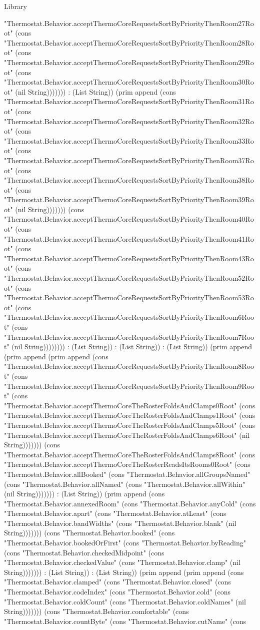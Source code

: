 \begin{lexlean}{Library}
\begin{semanticmodule}
{"Thermostat.Behavior.acceptThermoCoreRequestsSortByPriorityThenRoom27Root" (cons "Thermostat.Behavior.acceptThermoCoreRequestsSortByPriorityThenRoom28Root" (cons "Thermostat.Behavior.acceptThermoCoreRequestsSortByPriorityThenRoom29Root" (cons "Thermostat.Behavior.acceptThermoCoreRequestsSortByPriorityThenRoom30Root" (nil String))))))) : (List String)) (prim append (cons "Thermostat.Behavior.acceptThermoCoreRequestsSortByPriorityThenRoom31Root" (cons "Thermostat.Behavior.acceptThermoCoreRequestsSortByPriorityThenRoom32Root" (cons "Thermostat.Behavior.acceptThermoCoreRequestsSortByPriorityThenRoom33Root" (cons "Thermostat.Behavior.acceptThermoCoreRequestsSortByPriorityThenRoom37Root" (cons "Thermostat.Behavior.acceptThermoCoreRequestsSortByPriorityThenRoom38Root" (cons "Thermostat.Behavior.acceptThermoCoreRequestsSortByPriorityThenRoom39Root" (nil String))))))) (cons "Thermostat.Behavior.acceptThermoCoreRequestsSortByPriorityThenRoom40Root" (cons "Thermostat.Behavior.acceptThermoCoreRequestsSortByPriorityThenRoom41Root" (cons "Thermostat.Behavior.acceptThermoCoreRequestsSortByPriorityThenRoom43Root" (cons "Thermostat.Behavior.acceptThermoCoreRequestsSortByPriorityThenRoom52Root" (cons "Thermostat.Behavior.acceptThermoCoreRequestsSortByPriorityThenRoom53Root" (cons "Thermostat.Behavior.acceptThermoCoreRequestsSortByPriorityThenRoom6Root" (cons "Thermostat.Behavior.acceptThermoCoreRequestsSortByPriorityThenRoom7Root" (nil String)))))))) : (List String)) : (List String)) : (List String)) (prim append (prim append (prim append (cons "Thermostat.Behavior.acceptThermoCoreRequestsSortByPriorityThenRoom8Root" (cons "Thermostat.Behavior.acceptThermoCoreRequestsSortByPriorityThenRoom9Root" (cons "Thermostat.Behavior.acceptThermoCoreTheRosterFoldsAndClamps0Root" (cons "Thermostat.Behavior.acceptThermoCoreTheRosterFoldsAndClamps1Root" (cons "Thermostat.Behavior.acceptThermoCoreTheRosterFoldsAndClamps5Root" (cons "Thermostat.Behavior.acceptThermoCoreTheRosterFoldsAndClamps6Root" (nil String))))))) (cons "Thermostat.Behavior.acceptThermoCoreTheRosterFoldsAndClamps8Root" (cons "Thermostat.Behavior.acceptThermoCoreTheRosterReadsItsRooms0Root" (cons "Thermostat.Behavior.allBooked" (cons "Thermostat.Behavior.allGroupsNamed" (cons "Thermostat.Behavior.allNamed" (cons "Thermostat.Behavior.allWithin" (nil String))))))) : (List String)) (prim append (cons "Thermostat.Behavior.annexedRoom" (cons "Thermostat.Behavior.anyCold" (cons "Thermostat.Behavior.apart" (cons "Thermostat.Behavior.atLeast" (cons "Thermostat.Behavior.bandWidths" (cons "Thermostat.Behavior.blank" (nil String))))))) (cons "Thermostat.Behavior.booked" (cons "Thermostat.Behavior.bookedOrFirst" (cons "Thermostat.Behavior.byReading" (cons "Thermostat.Behavior.checkedMidpoint" (cons "Thermostat.Behavior.checkedValue" (cons "Thermostat.Behavior.clamp" (nil String))))))) : (List String)) : (List String)) (prim append (prim append (cons "Thermostat.Behavior.clamped" (cons "Thermostat.Behavior.closed" (cons "Thermostat.Behavior.codeIndex" (cons "Thermostat.Behavior.cold" (cons "Thermostat.Behavior.coldCount" (cons "Thermostat.Behavior.coldNames" (nil String))))))) (cons "Thermostat.Behavior.comfortable" (cons "Thermostat.Behavior.countByte" (cons "Thermostat.Behavior.cutName" (cons }
\end{semanticmodule}
\end{lexlean}

